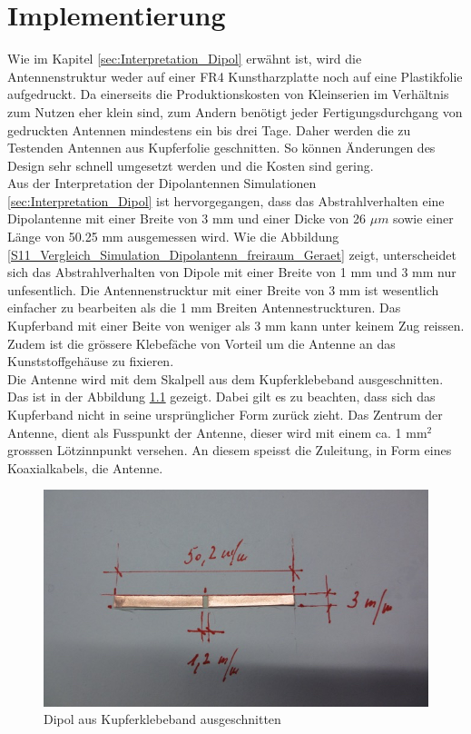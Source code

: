 \newpage 
\thispagestyle{empty}
\chapter{Implementierung}\label{sec:Implementierung}
Wie im Kapitel \ref{sec:Interpretation_Dipol} erwähnt ist, wird die Antennenstruktur weder auf einer FR4 Kunstharzplatte noch auf eine Plastikfolie aufgedruckt. Da einerseits die Produktionskosten von Kleinserien im Verhältnis zum Nutzen eher klein sind, zum Andern benötigt jeder Fertigungsdurchgang von gedruckten Antennen  mindestens ein bis drei Tage. Daher werden die zu Testenden Antennen aus Kupferfolie geschnitten. So können Änderungen des Design sehr schnell umgesetzt werden und die Kosten sind gering.\\

Aus der Interpretation der Dipolantennen Simulationen \ref{sec:Interpretation_Dipol} ist hervorgegangen, dass das Abstrahlverhalten eine Dipolantenne mit einer Breite von 3 mm und einer Dicke von 26 $\mu m$ sowie einer Länge von 50.25 mm ausgemessen wird. Wie die Abbildung \ref{S11_Vergleich_Simulation_Dipolantenn_freiraum_Geraet} zeigt, unterscheidet sich das Abstrahlverhalten von Dipole mit einer Breite von 1 mm und 3 mm nur unfesentlich. Die Antennenstrucktur mit einer Breite von 3 mm ist wesentlich einfacher zu bearbeiten als die 1 mm Breiten Antennestruckturen. Das Kupferband mit einer Beite von weniger als 3 mm kann unter keinem Zug reissen. Zudem ist die grössere Klebefäche von Vorteil um die Antenne an das Kunststoffgehäuse zu fixieren.  \\
\newpage
Die Antenne wird mit dem Skalpell aus dem Kupferklebeband ausgeschnitten. Das ist in der Abbildung \ref{fig:DipolausKupferband} gezeigt. Dabei gilt es zu beachten, dass sich das Kupferband nicht in seine ursprünglicher Form zurück zieht. Das Zentrum der Antenne, dient als Fusspunkt der Antenne, dieser wird mit einem ca. 1 mm$^{2}$ grosssen Lötzinnpunkt versehen. An diesem speisst die Zuleitung, in Form eines Koaxialkabels, die Antenne.\\
\begin{figure}[!ht]
	\centering
	\includegraphics[width=13cm]{content/bilder/Implementierung/Dipol3mm50mm.jpg}%
	\caption{Dipol aus Kupferklebeband ausgeschnitten}
	\label{fig:DipolausKupferband}
\end{figure}

